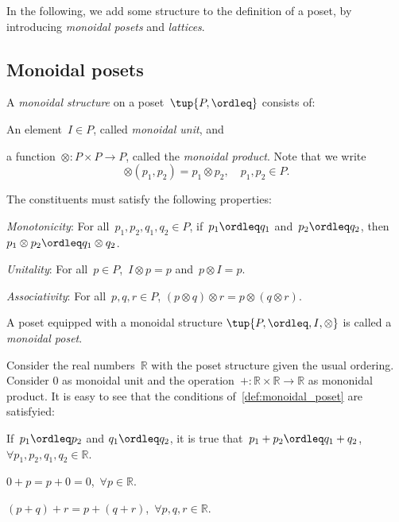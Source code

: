In the following, we add some structure to the definition of a poset, by introducing \emph{monoidal posets} and \emph{lattices}.
\subsection{Monoidal posets}
\begin{definition}
\label{def:monoidal_poset}
A \emph{monoidal structure} on a poset~$\tup{P,\ordleq}$ consists of:
\begin{compactenum}
    \item An element~$I\in P$, called \emph{monoidal unit}, and
    \item a function~$\otimes\colon P\times P\to P$, called the \emph{monoidal product}. Note that we write
    \begin{equation}
        \otimes(p_1,p_2)=p_1\otimes p_2, \quad p_1,p_2\in P.
    \end{equation}
\end{compactenum}
The constituents must satisfy the following properties:
\begin{compactenum}[(a)]
    \item \emph{Monotonicity}: For all~$p_1,p_2,q_1,q_2\in P$, if~$p_1\ordleq q_1$ and~$p_2\ordleq q_2$, then~$p_1\otimes p_2\ordleq q_1\otimes q_2$.
    \item \emph{Unitality}: For all~$p\in P$,~$I\otimes p=p$ and~$p\otimes I=p$.
    \item \emph{Associativity}: For all~$p,q,r\in P$, $(p\otimes q)\otimes r=p\otimes (q\otimes r)$.
\end{compactenum}
A poset equipped with a monoidal structure $\tup{P,\ordleq,I,\otimes}$ is called a \emph{monoidal poset}.
\end{definition}

\begin{example}
Consider the real numbers~$\mathbb{R}$ with the poset structure given the usual ordering. Consider 0 as monoidal unit and the operation~$+\colon \mathbb{R}\times \mathbb{R}\to \mathbb{R}$ as mononidal product. It is easy to see that the conditions of~\cref{def:monoidal_poset} are satisfyied:
\begin{compactenum}[(a)]
    \item If~$p_1\ordleq p_2$ and $q_1\ordleq q_2$, it is true that~$p_1+p_2\ordleq q_1+q_2$,~$\forall p_1,p_2,q_1,q_2\in \mathbb{R}$.
    \item $0+p=p+0=0$,~$\forall p\in \mathbb{R}$.
    \item $(p+q)+r=p+(q+r)$,~$\forall p,q,r\in \mathbb{R}$.
\end{compactenum}
\end{example}
